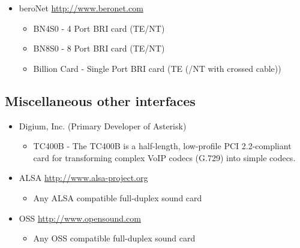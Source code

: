 \begin{itemize}
  \item beroNet 
  \url{http://www.beronet.com}
  \begin{itemize}
    \item BN4S0 - 4 Port BRI card (TE/NT)

    \item BN8S0 - 8 Port BRI card (TE/NT)

    \item Billion Card - Single Port BRI card (TE (/NT with crossed cable))
   \end{itemize}
\end{itemize}

\subsection{Miscellaneous other interfaces}

\begin{itemize}
  \item Digium, Inc. (Primary Developer of Asterisk)
  \begin{itemize}
    \item TC400B - The TC400B is a half-length, low-profile PCI 2.2-compliant card for transforming complex VoIP codecs (G.729) into simple codecs.
  \end{itemize}

  \item ALSA
        \url{http://www.alsa-project.org}
  \begin{itemize}
    \item Any ALSA compatible full-duplex sound card
  \end{itemize}

  \item OSS
        \url{http://www.opensound.com}
  \begin{itemize}
    \item Any OSS compatible full-duplex sound card
  \end{itemize}
\end{itemize}
